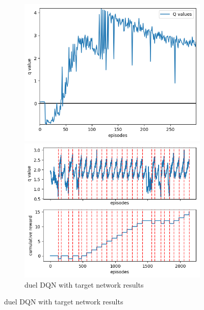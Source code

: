 \documentclass[10pt]{article}
\begin{document}
\begin{figure}
\begin{subfigure}{0.49\textwidth}
\begin{minipage}{\linewidth}
				\includegraphics[width=\linewidth]{duel_DDQN_qval.png}
			\end{minipage}\vfill
			\begin{minipage}{\linewidth}
				\includegraphics[width=\linewidth]{duel_DDQN_game.png}
			\end{minipage}	\vfill
			\caption{duel DQN with target network results}
		\end{subfigure}
	\setcounter{figure}{1}    
\end{figure}
\end{document}
